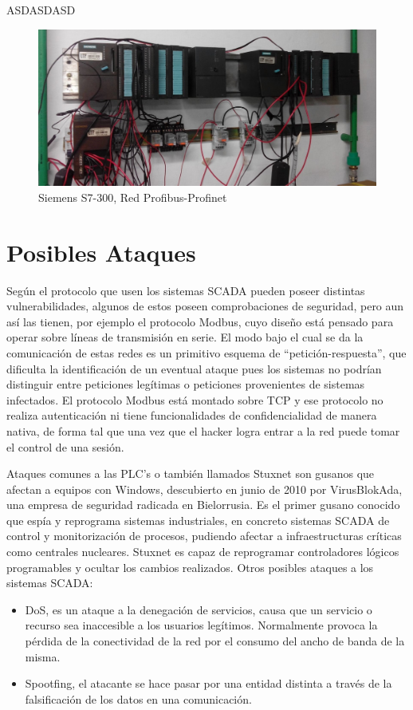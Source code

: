 \documentclass[jou,apacite]{apa6}   %
\begin{document}
ASDASDASD
\begin{figure}[htb]
\centering
\includegraphics[scale=0.2]{images/s73002.jpg}
\caption{Siemens S7-300, Red Profibus-Profinet} \label{fig:s73002}
\end{figure}

\section{Posibles Ataques}
Según el protocolo que usen los sistemas SCADA pueden poseer distintas vulnerabilidades, algunos de estos poseen comprobaciones de seguridad, pero aun así las tienen, por ejemplo el protocolo Modbus, cuyo diseño está pensado para operar sobre líneas de transmisión en serie. El modo bajo el cual se da la comunicación de estas redes es un primitivo esquema de “petición-respuesta”, que dificulta la identificación de un eventual ataque pues los sistemas no podrían distinguir entre peticiones legítimas o peticiones provenientes de sistemas infectados. El protocolo Modbus está montado sobre TCP y ese protocolo no realiza autenticación ni tiene funcionalidades de confidencialidad de manera nativa, de forma tal que una vez que el hacker logra entrar a la red puede tomar el control de una sesión.

Ataques comunes a las PLC’s o también llamados Stuxnet son gusanos que afectan a equipos con Windows, descubierto en junio de 2010 por VirusBlokAda, una empresa de seguridad radicada en Bielorrusia. Es el primer gusano conocido que espía y reprograma sistemas industriales, en concreto sistemas SCADA de control y monitorización de procesos, pudiendo afectar a infraestructuras críticas como centrales nucleares. 
Stuxnet es capaz de reprogramar controladores lógicos programables y ocultar los cambios realizados. 
Otros posibles ataques a los sistemas SCADA:

\begin{itemize}
\item DoS, es un ataque a la denegación de servicios, causa que un servicio o recurso sea inaccesible a los usuarios legítimos. Normalmente provoca la pérdida de la conectividad de la red por el consumo del ancho de banda de la misma.
\item Spootfing, el atacante se hace pasar por una entidad distinta a través de la falsificación de los datos en una comunicación.
\end{itemize}
\end{document}
